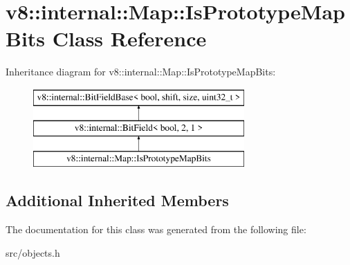 \hypertarget{classv8_1_1internal_1_1_map_1_1_is_prototype_map_bits}{}\section{v8\+:\+:internal\+:\+:Map\+:\+:Is\+Prototype\+Map\+Bits Class Reference}
\label{classv8_1_1internal_1_1_map_1_1_is_prototype_map_bits}
Inheritance diagram for v8\+:\+:internal\+:\+:Map\+:\+:Is\+Prototype\+Map\+Bits\+:\begin{figure}[H]
\begin{center}
\leavevmode
\includegraphics[height=3.000000cm]{classv8_1_1internal_1_1_map_1_1_is_prototype_map_bits}
\end{center}
\end{figure}
\subsection*{Additional Inherited Members}


The documentation for this class was generated from the following file\+:\begin{DoxyCompactItemize}
\item 
src/objects.\+h\end{DoxyCompactItemize}
